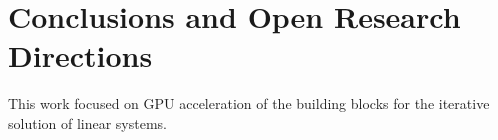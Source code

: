 \section{Conclusions and Open Research Directions}

This work focused on GPU acceleration of the building blocks for the
iterative solution of linear systems. 
